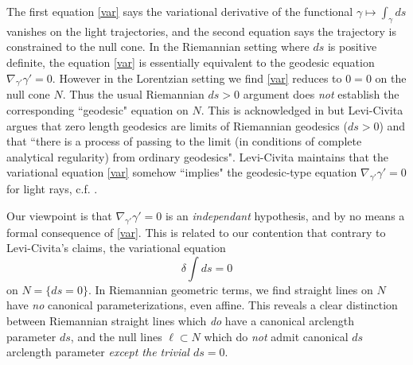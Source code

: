 \documentclass[12pt]{amsart}
\begin{document}
The first equation \eqref{var} says the variational derivative of the functional $\gamma \mapsto \int_\gamma ds$ vanishes on the light trajectories, and the second equation says the trajectory is constrained to the null cone. In the Riemannian setting where $ds$ is positive definite, the equation \eqref{var} is essentially equivalent to the geodesic equation $\nabla_{\gamma'} \gamma'=0$. However in the Lorentzian setting we find \eqref{var} reduces to $0=0$ on the null cone $N$. Thus the usual Riemannian $ds>0$ argument does \emph{not} establish the corresponding ``geodesic" equation on $N$. This is acknowledged in \cite[III.XI.14]{levi} but Levi-Civita argues that zero length geodesics are limits of Riemannian geodesics ($ds>0$) and that ``there is a process of passing to the limit (in conditions of complete analytical regularity) from ordinary geodesics". Levi-Civita maintains that the variational equation \eqref{var} somehow ``implies" the geodesic-type equation $\nabla_{\gamma'} \gamma'=0$ for light rays, c.f. \cite[III.XI.18]{levi}. 

Our viewpoint is that $\nabla_{\gamma'} \gamma'=0$ is an \emph{independant} hypothesis, and by no means a formal consequence of \eqref{var}. This is related to our contention that contrary to Levi-Civita's claims, the variational equation $$\delta \int ds =0$$ on $N=\{ds=0\}$. In Riemannian geometric terms,  we find straight lines on $N$ have \emph{no} canonical parameterizations, even affine. This reveals a clear distinction between Riemannian straight lines which \emph{do} have a canonical arclength parameter $ds$, and the null lines $\ell \subset N$ which do \emph{not} admit canonical $ds$ arclength parameter \emph{except the trivial $ds=0$}. 




\end{document}
